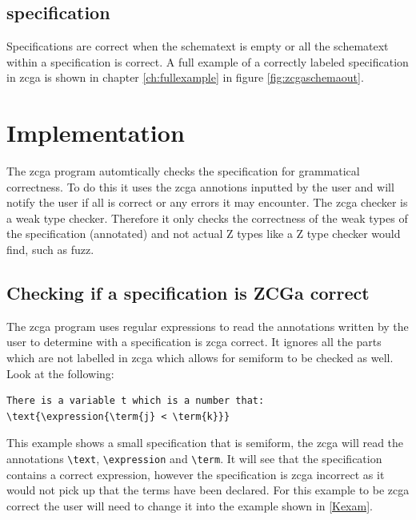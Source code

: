\subsection{specification}

Specifications are correct when the schematext is empty or all the schematext within a specification is correct. A full example of a correctly labeled specification in \gls{zcga} is shown in chapter \ref{ch:fullexample} in figure \ref{fig:zcgaschemaout}.

\section{Implementation}

The \gls{zcga} program automtically checks the specification for grammatical correctness. To do this it uses the \gls{zcga} annotions inputted by the user and will notify the user if all is correct or any errors it may encounter. The \gls{zcga} checker is a weak type checker. Therefore it only checks the correctness of the weak types of the specification (annotated) and not actual Z types like a Z type checker would find, such as fuzz.

\subsection{Checking if a specification is ZCGa correct}

The \gls{zcga} program uses regular expressions to read the annotations written by the user to determine with a specification is \gls{zcga} correct. It ignores all the parts which are not labelled in \gls{zcga} which allows for \gls{semiform} to be checked as well. Look at the following:

\begin{exam}
\begin{verbatim}
There is a variable t which is a number that:
\text{\expression{\term{j} < \term{k}}}
\end{verbatim}
\end{exam}

This example shows a small specification that is \gls{semiform}, the \gls{zcga} will read the annotations \verb|\text|, \verb|\expression| and \verb|\term|. It will see that the specification contains a correct expression, however the specification is \gls{zcga} incorrect as it would not pick up that the terms have been declared. For this example to be \gls{zcga} correct the user will need to change it into the example shown in \ref{Kexam}.


